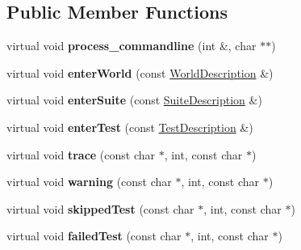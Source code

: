 \subsection*{Public Member Functions}
\begin{DoxyCompactItemize}
\item 
\hypertarget{classCxxTest_1_1TestListener_affe10d1dbddd6c839c27d3ec65120bd0}{virtual void {\bfseries process\-\_\-commandline} (int \&, char $\ast$$\ast$)}\label{classCxxTest_1_1TestListener_affe10d1dbddd6c839c27d3ec65120bd0}

\item 
\hypertarget{classCxxTest_1_1TestListener_a947f7954fbfeb604df5c183c92811bbd}{virtual void {\bfseries enter\-World} (const \hyperlink{classCxxTest_1_1WorldDescription}{World\-Description} \&)}\label{classCxxTest_1_1TestListener_a947f7954fbfeb604df5c183c92811bbd}

\item 
\hypertarget{classCxxTest_1_1TestListener_aec118cbeef8ae759abf47a6c05c4edc0}{virtual void {\bfseries enter\-Suite} (const \hyperlink{classCxxTest_1_1SuiteDescription}{Suite\-Description} \&)}\label{classCxxTest_1_1TestListener_aec118cbeef8ae759abf47a6c05c4edc0}

\item 
\hypertarget{classCxxTest_1_1TestListener_af9a62cbee47da01007d1b14c46b32ae8}{virtual void {\bfseries enter\-Test} (const \hyperlink{classCxxTest_1_1TestDescription}{Test\-Description} \&)}\label{classCxxTest_1_1TestListener_af9a62cbee47da01007d1b14c46b32ae8}

\item 
\hypertarget{classCxxTest_1_1TestListener_a48eda6cf72cbde6f66a18e871f2d26a1}{virtual void {\bfseries trace} (const char $\ast$, int, const char $\ast$)}\label{classCxxTest_1_1TestListener_a48eda6cf72cbde6f66a18e871f2d26a1}

\item 
\hypertarget{classCxxTest_1_1TestListener_a3d8cce23c2b32da3940bfc97d85a9e5b}{virtual void {\bfseries warning} (const char $\ast$, int, const char $\ast$)}\label{classCxxTest_1_1TestListener_a3d8cce23c2b32da3940bfc97d85a9e5b}

\item 
\hypertarget{classCxxTest_1_1TestListener_a88add6d704c23c5ed717b3213106103e}{virtual void {\bfseries skipped\-Test} (const char $\ast$, int, const char $\ast$)}\label{classCxxTest_1_1TestListener_a88add6d704c23c5ed717b3213106103e}

\item 
\hypertarget{classCxxTest_1_1TestListener_a171426c253fe615c18033480e1305e84}{virtual void {\bfseries failed\-Test} (const char $\ast$, int, const char $\ast$)}\label{classCxxTest_1_1TestListener_a171426c253fe615c18033480e1305e84}


\end{DoxyCompactItemize}
